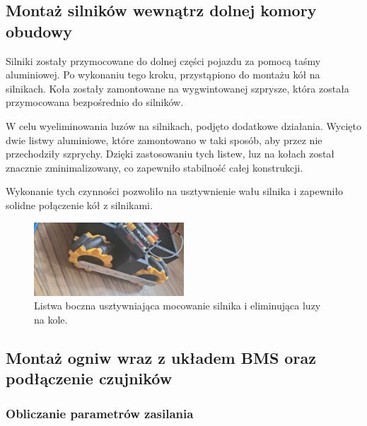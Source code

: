 \documentclass{report}
\begin{document}
\subsection{\Large Montaż silników wewnątrz dolnej komory obudowy}

%
%
Silniki zostały przymocowane do dolnej części pojazdu za pomocą taśmy aluminiowej. Po wykonaniu tego kroku, przystąpiono do montażu kół na silnikach. Koła zostały zamontowane na wygwintowanej szprysze, która została przymocowana bezpośrednio do silników.

W celu wyeliminowania luzów na silnikach, podjęto dodatkowe działania. Wycięto dwie listwy aluminiowe, które zamontowano w taki sposób, aby przez nie przechodziły szprychy. Dzięki zastosowaniu tych listew, luz na kołach został znacznie zminimalizowany, co zapewniło stabilność całej konstrukcji.

Wykonanie tych czynności pozwoliło na usztywnienie wału silnika i zapewniło solidne połączenie kół z silnikami.
\begin{figure}[H]
    \centering
    \includegraphics*[width=0.5\textwidth]{"src/Robot_pics/listwa-kola.jpg"}
    \caption{Listwa boczna usztywniająca mocowanie silnika i eliminująca luzy na kole.}
    \label{fig:listwa-kola}
\end{figure}

\subsection{\Large Montaż ogniw wraz z układem BMS oraz podłączenie czujników}

%
%


\subsubsection{\large Obliczanie parametrów zasilania}
\end{document}
